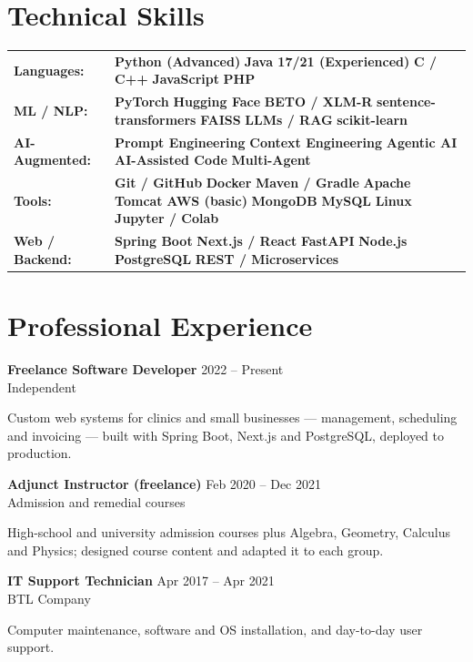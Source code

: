 \documentclass[10pt,letterpaper]{article}
\newcommand{\entry}[4]{%
  \noindent
  \textbf{#1} \hfill {\small\color{textsec}#2}\\
  {\small\color{accent}#3}
  \vspace{0.08cm}
  \par\noindent#4
  \par\vspace{0.16cm}
}
\newcommand{\skill}[1]{{\footnotesize\bfseries\color{primary}\hspace{0.5mm}\hspace{1mm}#1\hspace{1mm}}}
\begin{document}
\section*{Technical Skills}
\small
\noindent
\begin{tabular}{@{}p{2.9cm}@{}>{\RaggedLeft\arraybackslash}p{\dimexpr\textwidth-2.9cm\relax}@{}}
{\bfseries\color{primary} Languages:} & \skill{Python (Advanced)} \skill{Java 17/21 (Experienced)} \skill{C / C++} \skill{JavaScript} \skill{PHP} \\[0.1cm]
{\bfseries\color{primary} ML / NLP:} & \skill{PyTorch} \skill{Hugging Face} \skill{BETO / XLM-R} \skill{sentence-transformers} \skill{FAISS} \skill{LLMs / RAG} \skill{scikit-learn} \\[0.1cm]
{\bfseries\color{primary} AI-Augmented:} & \skill{Prompt Engineering} \skill{Context Engineering} \skill{Agentic AI} \skill{AI-Assisted Code} \skill{Multi-Agent} \\[0.1cm]
{\bfseries\color{primary} Tools:} & \skill{Git / GitHub} \skill{Docker} \skill{Maven / Gradle} \skill{Apache Tomcat} \skill{AWS (basic)} \skill{MongoDB} \skill{MySQL} \skill{Linux} \skill{Jupyter / Colab} \\[0.1cm]
{\bfseries\color{primary} Web / Backend:} & \skill{Spring Boot} \skill{Next.js / React} \skill{FastAPI} \skill{Node.js} \skill{PostgreSQL} \skill{REST / Microservices}
\end{tabular}


\vspace{0.5cm}
\section*{Professional Experience}
\entry{Freelance Software Developer}
       {2022 -- Present}
       {Independent}
       {Custom web systems for clinics and small businesses — management, scheduling and invoicing — built with Spring Boot, Next.js and PostgreSQL, deployed to production.}

\entry{Adjunct Instructor (freelance)}
       {Feb 2020 -- Dec 2021}
       {Admission and remedial courses}
       {High-school and university admission courses plus Algebra, Geometry, Calculus and Physics; designed course content and adapted it to each group.}

\entry{IT Support Technician}
       {Apr 2017 -- Apr 2021}
       {BTL Company}
       {Computer maintenance, software and OS installation, and day-to-day user support.}
\end{document}
